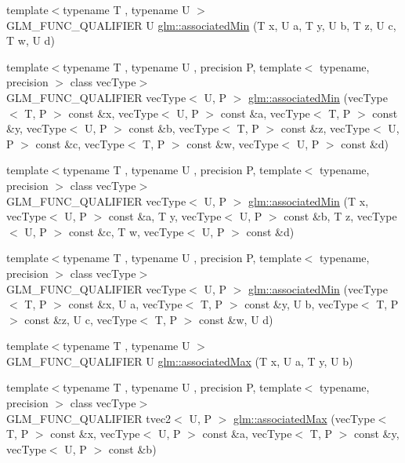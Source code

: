 \begin{DoxyCompactItemize}
\item 
{\footnotesize template$<$typename T , typename U $>$ }\\G\+L\+M\+\_\+\+F\+U\+N\+C\+\_\+\+Q\+U\+A\+L\+I\+F\+I\+E\+R U \hyperlink{group__gtx__associated__min__max_ga432224ebe2085eaa2b63a077ecbbbff6}{glm\+::associated\+Min} (T x, U a, T y, U b, T z, U c, T w, U d)
\item 
{\footnotesize template$<$typename T , typename U , precision P, template$<$ typename, precision $>$ class vec\+Type$>$ }\\G\+L\+M\+\_\+\+F\+U\+N\+C\+\_\+\+Q\+U\+A\+L\+I\+F\+I\+E\+R vec\+Type$<$ U, P $>$ \hyperlink{group__gtx__associated__min__max_ga88e031f22b80215505928900d3dde549}{glm\+::associated\+Min} (vec\+Type$<$ T, P $>$ const \&x, vec\+Type$<$ U, P $>$ const \&a, vec\+Type$<$ T, P $>$ const \&y, vec\+Type$<$ U, P $>$ const \&b, vec\+Type$<$ T, P $>$ const \&z, vec\+Type$<$ U, P $>$ const \&c, vec\+Type$<$ T, P $>$ const \&w, vec\+Type$<$ U, P $>$ const \&d)
\item 
{\footnotesize template$<$typename T , typename U , precision P, template$<$ typename, precision $>$ class vec\+Type$>$ }\\G\+L\+M\+\_\+\+F\+U\+N\+C\+\_\+\+Q\+U\+A\+L\+I\+F\+I\+E\+R vec\+Type$<$ U, P $>$ \hyperlink{group__gtx__associated__min__max_ga0f63b0dce5a5c3242cc6d9847e7d14f1}{glm\+::associated\+Min} (T x, vec\+Type$<$ U, P $>$ const \&a, T y, vec\+Type$<$ U, P $>$ const \&b, T z, vec\+Type$<$ U, P $>$ const \&c, T w, vec\+Type$<$ U, P $>$ const \&d)
\item 
{\footnotesize template$<$typename T , typename U , precision P, template$<$ typename, precision $>$ class vec\+Type$>$ }\\G\+L\+M\+\_\+\+F\+U\+N\+C\+\_\+\+Q\+U\+A\+L\+I\+F\+I\+E\+R vec\+Type$<$ U, P $>$ \hyperlink{group__gtx__associated__min__max_ga00a949fd345f4b31b259f033d3ab4a1c}{glm\+::associated\+Min} (vec\+Type$<$ T, P $>$ const \&x, U a, vec\+Type$<$ T, P $>$ const \&y, U b, vec\+Type$<$ T, P $>$ const \&z, U c, vec\+Type$<$ T, P $>$ const \&w, U d)
\item 
{\footnotesize template$<$typename T , typename U $>$ }\\G\+L\+M\+\_\+\+F\+U\+N\+C\+\_\+\+Q\+U\+A\+L\+I\+F\+I\+E\+R U \hyperlink{group__gtx__associated__min__max_ga7d9c8785230c8db60f72ec8975f1ba45}{glm\+::associated\+Max} (T x, U a, T y, U b)
\item 
{\footnotesize template$<$typename T , typename U , precision P, template$<$ typename, precision $>$ class vec\+Type$>$ }\\G\+L\+M\+\_\+\+F\+U\+N\+C\+\_\+\+Q\+U\+A\+L\+I\+F\+I\+E\+R tvec2$<$ U, P $>$ \hyperlink{group__gtx__associated__min__max_ga10ba6001798f42a0f941f19ff30e066a}{glm\+::associated\+Max} (vec\+Type$<$ T, P $>$ const \&x, vec\+Type$<$ U, P $>$ const \&a, vec\+Type$<$ T, P $>$ const \&y, vec\+Type$<$ U, P $>$ const \&b)

\end{DoxyCompactItemize}
